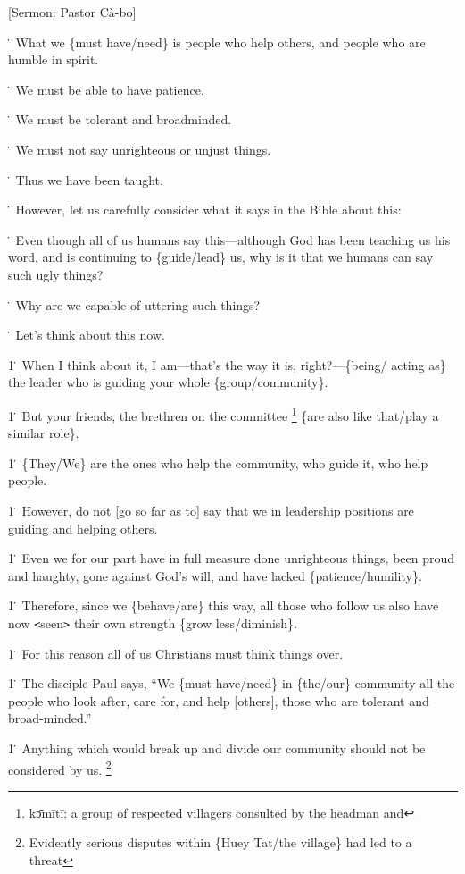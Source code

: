 
[Sermon: Pastor Cà-bo]

\. What we \{must have/need\} is people who help others, and people who are humble
in spirit.

\. We must be able to have patience.

\. We must be tolerant and broadminded.

\. We must not say unrighteous or unjust things.

\. Thus we have been taught.

\. However, let us carefully consider what it says in the Bible about this:

\. Even though all of us humans say this---although God has been teaching us his
word, and is continuing to \{guide/lead\} us, why is it that we humans can say
such ugly things?

\. Why are we capable of uttering such things?

\. Let's think about this now.

1\. When I think about it, I am---that's the way it is, right?---\{being/ acting
as\} the leader who is guiding your whole \{group/community\}.

1\. But your friends, the brethren on the committee \footnote{kɔ̄mītī: a group of respected villagers consulted by the headman and} \{are also like that/play
a similar role\}.

1\. \{They/We\} are the ones who help the community, who guide it, who help people.

1\. However, do not [go so far as to] say that we in leadership positions are guiding
and helping others.

1\. Even we for our part have in full measure done unrighteous things, been proud
and haughty, gone against God's will, and have lacked \{patience/humility\}.

1\. Therefore, since we \{behave/are\} this way, all those who follow us also have
now \texttt{<}seen\texttt{>} their own strength \{grow less/diminish\}.

1\. For this reason all of us Christians must think things over.

1\. The disciple Paul says, ``We \{must have/need\} in \{the/our\} community all
the people who look after, care for, and help [others], those who are tolerant
and broad-minded.''

1\. Anything which would break up and divide our community should not be considered
by us. \footnote{Evidently serious disputes within \{Huey Tat/the village\} had led to a threat}

